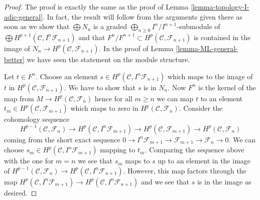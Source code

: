 \documentclass[10pt,a4paper]{amsart}
\theoremstyle{plain}
\theoremstyle{definition}
\theoremstyle{remark}
\numberwithin{equation}{subsection}
\begin{document}
\begin{proof}
The proof is exactly the same as the proof of
Lemma \ref{lemma-topology-I-adic-general}.
In fact, the result will follow from the arguments given there
as soon as we show that
$\bigoplus N_n$ is a graded $\bigoplus_{n \geq 0} I^n/I^{n + 1}$-submodule
of $\bigoplus H^{p + 1}(\mathcal{C}, I^n\mathcal{F}_{n + 1})$
and that $F^n/F^{n + 1} \subset H^p(\mathcal{C}, \mathcal{F}_{n + 1})$
is contained in the image of $N_n \to H^p(\mathcal{C}, \mathcal{F}_{n + 1})$.
In the proof of Lemma \ref{lemma-ML-general-better}
we have seen the statement on the module structure.

\medskip\noindent
Let $t \in F^n$. Choose an element
$s \in H^p(\mathcal{C}, I^n\mathcal{F}_{n + 1})$
which maps to the image of $t$ in $H^p(\mathcal{C}, \mathcal{F}_{n + 1})$.
We have
to show that $s$ is in $N_n$. Now $F^n$ is the kernel of the map from
$M \to H^p(\mathcal{C}, \mathcal{F}_n)$ hence for all $m \geq n$ we can map $t$
to an element $t_m \in H^p(\mathcal{C}, \mathcal{F}_{m + 1})$ which maps
to zero in $H^p(\mathcal{C}, \mathcal{F}_n)$. Consider the cohomology sequence
$$
H^{p - 1}(\mathcal{C}, \mathcal{F}_n) \to
H^p(\mathcal{C}, I^n\mathcal{F}_{m + 1}) \to
H^p(\mathcal{C}, \mathcal{F}_{m + 1}) \to
H^p(\mathcal{C}, \mathcal{F}_n)
$$
coming from the short exact sequence
$0 \to I^n\mathcal{F}_{m + 1} \to \mathcal{F}_{m + 1} \to \mathcal{F}_n \to 0$.
We can choose $s_m \in H^p(\mathcal{C}, I^n\mathcal{F}_{m + 1})$
mapping to $t_m$.
Comparing the sequence above with the one for $m = n$ we see that
$s_m$ maps to $s$ up to an element in the image of
$H^{p - 1}(\mathcal{C}, \mathcal{F}_n) \to
H^p(\mathcal{C}, I^n\mathcal{F}_{n + 1})$.
However, this map factors through the map
$H^p(\mathcal{C}, I^n\mathcal{F}_{m + 1}) \to
H^p(\mathcal{C}, I^n\mathcal{F}_{n + 1})$
and we see that $s$ is in the image as desired.
\end{proof}
\end{document}
